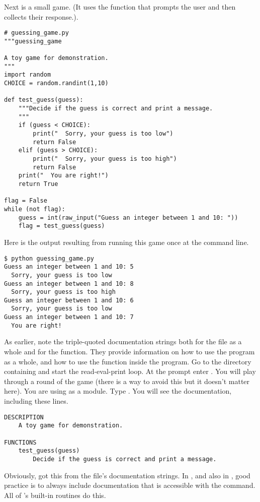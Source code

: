 Next is a small game. 
(It uses the \python{} function  that prompts the user
and then collects their response.).
\begin{lstlisting}[style=python]
# guessing_game.py
"""guessing_game

A toy game for demonstration.
"""
import random
CHOICE = random.randint(1,10)

def test_guess(guess):
    """Decide if the guess is correct and print a message.
    """
    if (guess < CHOICE):
        print("  Sorry, your guess is too low")
        return False
    elif (guess > CHOICE):
        print("  Sorry, your guess is too high")
        return False
    print("  You are right!")
    return True

flag = False
while (not flag):
    guess = int(raw_input("Guess an integer between 1 and 10: "))
    flag = test_guess(guess)
\end{lstlisting}
Here is the output resulting from running this game once at the command line.
\begin{lstlisting}
$ python guessing_game.py
Guess an integer between 1 and 10: 5
  Sorry, your guess is too low
Guess an integer between 1 and 10: 8
  Sorry, your guess is too high
Guess an integer between 1 and 10: 6
  Sorry, your guess is too low
Guess an integer between 1 and 10: 7
  You are right!
\end{lstlisting}  %

As earlier, note the triple-quoted documentation strings both for the 
file as a whole and for the function.
They provide information on how to use the 
program as a whole,
and how to use the function inside the program. 
Go to the directory containing  and start 
the \python{} read-eval-print loop.
At the \inlinecode{>>>} prompt enter .
You will play through a round of the game (there is a way to avoid this
but it doesn't matter here).
You are using  as a module.
Type
.
You will see the documentation, including these lines.
\begin{lstlisting}
DESCRIPTION
    A toy game for demonstration.

FUNCTIONS
    test_guess(guess)
        Decide if the guess is correct and print a message. 
\end{lstlisting}
Obviously, \python{} got this from the file's documentation strings.
In \python{}, and also in \Sage, good practice is 
to always include documentation
that is accessible with the  command.
All of \Sage's built-in routines do this.


